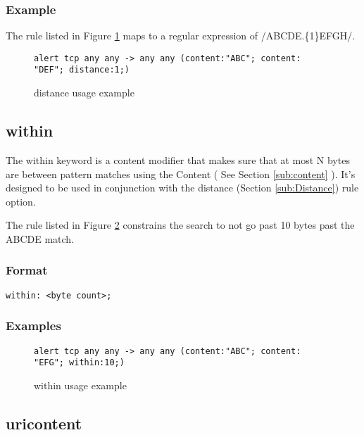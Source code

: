 \documentclass[english]{report}
\begin{document}
\subsubsection{Example}

The rule listed in Figure \ref{fig:Distance} maps to a regular
expression of /ABCDE.\{1\}EFGH/.

\begin{figure}[!hbpt]
\begin{verbatim}
alert tcp any any -> any any (content:"ABC"; content: "DEF"; distance:1;)
\end{verbatim}
\caption{distance usage example \label{fig:Distance}}
\end{figure}



\subsection{within\label{sub:Within}}

The within keyword is a content modifier that makes sure that
at most N bytes are between pattern matches using the Content ( See
Section \ref{sub:content} ).  It's designed to be used in conjunction
with the distance (Section \ref{sub:Distance}) rule option.

The rule listed in Figure \ref{fig:Within} constrains the search to not
go past 10 bytes past the ABCDE match. 

\subsubsection{Format}

\begin{verbatim}
within: <byte count>;
\end{verbatim}

\subsubsection{Examples}

\begin{figure}[!hbpt]
\begin{verbatim}
alert tcp any any -> any any (content:"ABC"; content: "EFG"; within:10;)
\end{verbatim}
\caption{within usage example \label{fig:Within}}
\end{figure}


\subsection{uricontent}
\end{document}
